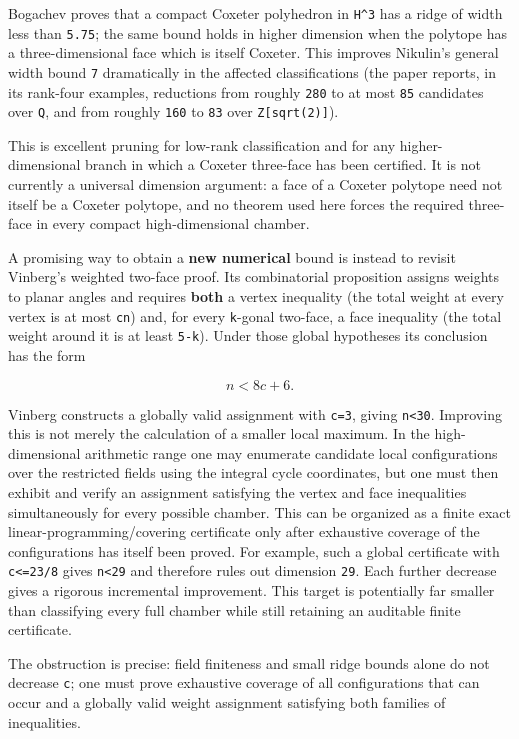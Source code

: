 \documentclass[
  10pt,
]{report}
\begin{document}
Bogachev proves that a compact Coxeter polyhedron in \texttt{H\^{}3} has
a ridge of width less than \texttt{5.75}; the same bound holds in higher
dimension when the polytope has a three-dimensional face which is itself
Coxeter. This improves Nikulin's general width bound \texttt{7}
dramatically in the affected classifications (the paper reports, in its
rank-four examples, reductions from roughly \texttt{280} to at most
\texttt{85} candidates over \texttt{Q}, and from roughly \texttt{160} to
\texttt{83} over \texttt{Z{[}sqrt(2){]}}).

This is excellent pruning for low-rank classification and for any
higher-dimensional branch in which a Coxeter three-face has been
certified. It is not currently a universal dimension argument: a face of
a Coxeter polytope need not itself be a Coxeter polytope, and no theorem
used here forces the required three-face in every compact
high-dimensional chamber.

A promising way to obtain a \textbf{new numerical} bound is instead to
revisit Vinberg's weighted two-face proof. Its combinatorial proposition
assigns weights to planar angles and requires \textbf{both} a vertex
inequality (the total weight at every vertex is at most \texttt{cn})
and, for every \texttt{k}-gonal two-face, a face inequality (the total
weight around it is at least \texttt{5-k}). Under those global
hypotheses its conclusion has the form

\[
                         n<8c+6.                         \tag{5.1}
\]

Vinberg constructs a globally valid assignment with \texttt{c=3}, giving
\texttt{n\textless{}30}. Improving this is not merely the calculation of
a smaller local maximum. In the high-dimensional arithmetic range one
may enumerate candidate local configurations over the restricted fields
using the integral cycle coordinates, but one must then exhibit and
verify an assignment satisfying the vertex and face inequalities
simultaneously for every possible chamber. This can be organized as a
finite exact linear-programming/covering certificate only after
exhaustive coverage of the configurations has itself been proved. For
example, such a global certificate with \texttt{c\textless{}=23/8} gives
\texttt{n\textless{}29} and therefore rules out dimension \texttt{29}.
Each further decrease gives a rigorous incremental improvement. This
target is potentially far smaller than classifying every full chamber
while still retaining an auditable finite certificate.

The obstruction is precise: field finiteness and small ridge bounds
alone do not decrease \texttt{c}; one must prove exhaustive coverage of
all configurations that can occur and a globally valid weight assignment
satisfying both families of inequalities.
\end{document}
